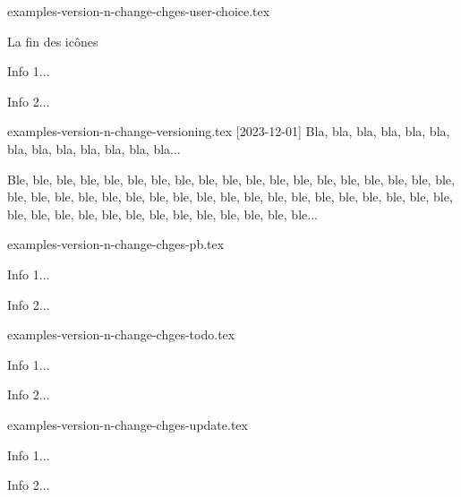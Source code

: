 \begin{filecontents*}[overwrite]{examples-version-n-change-chges-user-choice.tex}
\begin{tdoctopic}{La fin des icônes}
    \item Info 1...
    \item Info 2...
\end{tdoctopic}
\end{filecontents*}


\begin{filecontents*}[overwrite]{examples-version-n-change-versioning.tex}
[2023-12-01]
Bla, bla, bla, bla, bla, bla, bla, bla, bla, bla, bla, bla, bla...

\bigskip %

Ble, ble, ble, ble, ble, ble, ble, ble, ble, ble, ble, ble, ble,
ble, ble, ble, ble, ble, ble, ble, ble, ble, ble, ble, ble, ble,
ble, ble, ble, ble, ble, ble, ble, ble, ble, ble, ble, ble, ble,
ble, ble, ble, ble, ble, ble, ble, ble, ble, ble, ble, ble...
\end{filecontents*}


\begin{filecontents*}[overwrite]{examples-version-n-change-chges-pb.tex}
\begin{tdocprob}
    \item Info 1...
    \item Info 2...
\end{tdocprob}
\end{filecontents*}


\begin{filecontents*}[overwrite]{examples-version-n-change-chges-todo.tex}
\begin{tdoctodo}
    \item Info 1...
    \item Info 2...
\end{tdoctodo}
\end{filecontents*}


\begin{filecontents*}[overwrite]{examples-version-n-change-chges-update.tex}
\begin{tdocupdate}
    \item Info 1...
    \item Info 2...
\end{tdocupdate}
\end{filecontents*}


